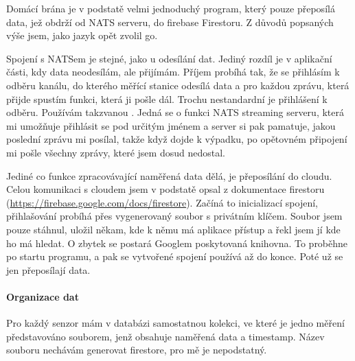 Domácí brána je v podstatě velmi jednoduchý program, který pouze přeposílá data, jež obdrží od NATS serveru, do 
\gls{firebase} Firestoru. Z důvodů popsaných výše jsem, jako jazyk opět zvolil \gls{go}.


Spojení s NATSem je stejné, jako u odesílání dat. Jediný rozdíl je v aplikační části, kdy data neodesílám, ale přijímám. 
Příjem probíhá tak, že se přihlásím k odběru kanálu, do kterého měřící stanice odesílá data a pro každou zprávu, která 
přijde spustím funkci, která ji pošle dál. Trochu nestandardní je přihlášení k odběru. Používám takzvanou . Jedná se o funkci NATS streaming serveru, která mi umožňuje přihlásit se pod určitým jménem a server si 
pak pamatuje, jakou poslední zprávu mi posílal, takže když dojde k výpadku, po opětovném připojení mi pošle všechny 
zprávy, které jsem dosud nedostal.

Jediné co funkce zpracovávající naměřená data dělá, je přeposílání do cloudu. Celou komunikaci s cloudem jsem v podstatě 
opsal z dokumentace firestoru (\url{https://firebase.google.com/docs/firestore}). Začíná to inicializací spojení, 
přihlašování probíhá přes vygenerovaný soubor s privátním klíčem. Soubor jsem pouze stáhnul, uložil někam, kde k němu má 
aplikace přístup a řekl jsem jí kde ho má hledat. O zbytek se postará Googlem poskytovaná \gls{knihovna}. To proběhne po 
startu programu, a pak se vytvořené spojení používá až do konce. Poté už se jen přeposílají data.

\paragraph*{Organizace dat}
Pro každý senzor mám v databázi samostatnou kolekci, ve které je jedno měření představováno souborem, jenž obsahuje 
naměřená data a \gls{timestamp}. Název souboru nechávám generovat firestore, pro mě je nepodstatný.
